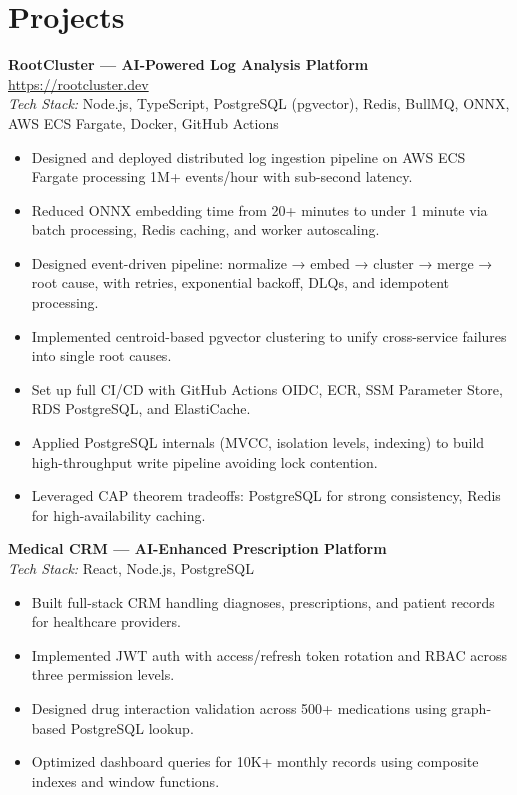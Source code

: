 \documentclass[11pt]{article}
\begin{document}
\section{Projects}
\textbf{RootCluster — AI-Powered Log Analysis Platform} \href{https://rootcluster.dev}{https://rootcluster.dev}\\
\textit{Tech Stack:} Node.js, TypeScript, PostgreSQL (pgvector), Redis, BullMQ, ONNX, AWS ECS Fargate, Docker, GitHub Actions\\
\begin{itemize}
\item Designed and deployed distributed log ingestion pipeline on AWS ECS Fargate processing 1M+ events/hour with sub-second latency.
\item Reduced ONNX embedding time from 20+ minutes to under 1 minute via batch processing, Redis caching, and worker autoscaling.
\item Designed event-driven pipeline: normalize → embed → cluster → merge → root cause, with retries, exponential backoff, DLQs, and idempotent processing.
\item Implemented centroid-based pgvector clustering to unify cross-service failures into single root causes.
\item Set up full CI/CD with GitHub Actions OIDC, ECR, SSM Parameter Store, RDS PostgreSQL, and ElastiCache.
\item Applied PostgreSQL internals (MVCC, isolation levels, indexing) to build high-throughput write pipeline avoiding lock contention.
\item Leveraged CAP theorem tradeoffs: PostgreSQL for strong consistency, Redis for high-availability caching.
\end{itemize}

\textbf{Medical CRM — AI-Enhanced Prescription Platform}\\
\textit{Tech Stack:} React, Node.js, PostgreSQL\\
\begin{itemize}
\item Built full-stack CRM handling diagnoses, prescriptions, and patient records for healthcare providers.
\item Implemented JWT auth with access/refresh token rotation and RBAC across three permission levels.
\item Designed drug interaction validation across 500+ medications using graph-based PostgreSQL lookup.
\item Optimized dashboard queries for 10K+ monthly records using composite indexes and window functions.
\end{itemize}
\end{document}
